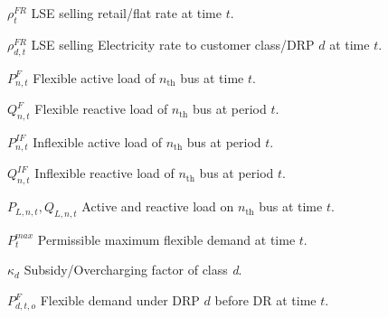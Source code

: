 \documentclass[journal]{IEEEtran}
\begin{document}
\begin{IEEEdescription}[\IEEEusemathlabelsep\IEEEsetlabelwidth{~~~~~~~~~~~~~}]
	\item[$\rho _t^{FR}$] LSE selling retail/flat rate at time $t$. 
	\item[$\rho _{d,t}^{FR}$] LSE selling Electricity rate to customer class/DRP $d$ at time $t$.
	\item[$P_{n,t}^{F}$]  Flexible active load of $n_\text{th}$ bus at time $t$.  
	\item[$Q_{n,t}^{F}$]  Flexible reactive load of $n_\text{th}$ bus at period $t$.  
	\item[$P_{n,t}^{IF}$]  Inflexible active load of $n_\text{th}$ bus at period $t$.  
	\item[$Q_{n,t}^{IF}$]  Inflexible reactive load of $n_\text{th}$ bus at period $t$.  
	\item[${P_{L,n,t}},{Q_{L,n,t}}$] Active and reactive load on $n_\text{th}$ bus at time $t$.
	\item[$P_t^{max}$] Permissible maximum flexible demand at time $t$. 
	\item[$\kappa_d$] Subsidy/Overcharging factor of class \textit{d}.
	\item[$P_{d,t,o}^{F}$] Flexible demand under DRP $d$ before DR at time $t$.

\end{IEEEdescription}
\end{document}
